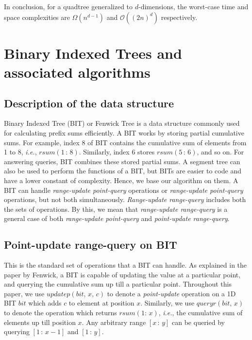 \documentclass[a4paper]{article}
\begin{document}
\vspace{2 mm}
In conclusion, for a quadtree generalized to $d$-dimensions, the worst-case time and space complexities are $\Omega(n^{d-1})$ and $\mathcal{O}((2n)^d)$ respectively.


\section{Binary Indexed Trees and associated algorithms}
\subsection{Description of the data structure}
Binary Indexed Tree (BIT) or Fenwick Tree\cite{BIT} is a data structure commonly used for calculating prefix sums efficiently. A BIT works by storing partial cumulative sums. For example, index 8 of BIT contains the cumulative sum of elements from 1 to 8, \textit{i.e.}, $rsum(1\, :\, 8)$. Similarly, index 6 stores $rsum(5\, :\, 6)$, and so on. For answering queries, BIT combines these stored partial sums. A segment tree can also be used to perform the functions of a BIT, but BITs are easier to code and have a lower constant of complexity. Hence, we base our algorithm on them. A BIT can handle \textit{range-update point-query} operations or \textit{range-update point-query} operations, but not both simultaneously. \textit{Range-update range-query} includes both the sets of operations. By this, we mean that \textit{range-update range-query} is a general case of both \textit{range-update point-query} and \textit{point-update range-query}.



\subsection{Point-update range-query on BIT}
This is the standard set of operations that a BIT can handle. As explained in the paper by Fenwick\cite{BIT}, a BIT is capable of updating the value at a particular point, and querying the cumulative sum up till a particular point. Throughout this paper, we use $updatep(bit,\, x,\, c)$ to denote a \textit{point-update} operation on a 1D BIT $bit$ which adds $c$ to element at position $x$. Similarly, we use $queryr(bit,\, x)$ to denote the operation which returns $rsum(1 :\, x)$, \textit{i.e.}, the cumulative sum of elements up till position $x$. Any arbitrary range $[x\, :\, y]$ can be queried by querying $[1\, :\, x-1]$ and $[1\, :\, y]$.
\end{document}

